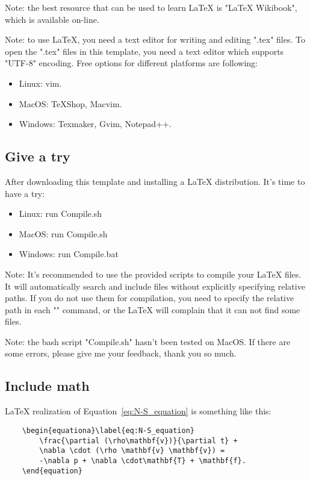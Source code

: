 Note: the best resource that can be used to learn \LaTeX{} is "\LaTeX{} Wikibook", which is available on-line.

Note: to use \LaTeX{}, you need a text editor for writing and editing ".tex" files. To open the ".tex" files in this template, you need a text editor which supports "UTF-8" encoding. Free options for different platforms are following:
\begin{itemize}
    \item Linux: vim. 
    \item MacOS: TeXShop, Macvim.
    \item Windows: Texmaker, Gvim, Notepad++. 
\end{itemize}

\subsection{Give a try} %
After downloading this template and installing a \LaTeX{} distribution. It's time to have a try:
\begin{itemize}
    \item Linux: run Compile.sh
    \item MacOS: run Compile.sh
    \item Windows: run Compile.bat
\end{itemize}

Note: It's recommended to use the provided scripts to compile your \LaTeX{} files. It will automatically search and include files without explicitly specifying relative paths. If you do not use them for compilation, you need to specify the relative path in each "\verb++" command, or the \LaTeX{} will complain that it can not find some files.

Note: the bash script "Compile.sh" hasn't been tested on MacOS. If there are some errors, please give me your feedback, thank you so much.


\subsection{Include math} %
\LaTeX{} realization of Equation~\ref{eq:N-S_equation} is something like this:
\begin{center}
    \small
    \begin{verbatim}
    \begin{equationa}\label{eq:N-S_equation}
        \frac{\partial (\rho\mathbf{v})}{\partial t} +
        \nabla \cdot (\rho \mathbf{v} \mathbf{v}) =
        -\nabla p + \nabla \cdot\mathbf{T} + \mathbf{f}. 
    \end{equation}    
\end{verbatim}
\end{center}

